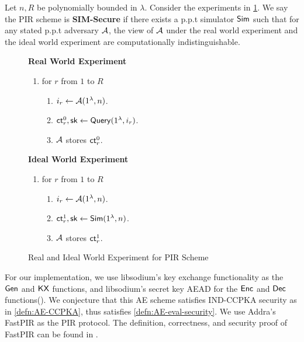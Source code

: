 \begin{definition}
\label{defn:PIR-SIM-security}
Let $n, R$ be polynomially bounded in $\lambda$. Consider the experiments in \cref{expr:pir-real-ideal-world}. We say the PIR scheme is \textbf{SIM-Secure} if there exists a p.p.t simulator $\mathsf{Sim}$ such that for any stated p.p.t adversary $\mathcal{A}$, the view of $\mathcal{A}$ under the real world experiment and the ideal world experiment are computationally indistinguishable. 

\begin{figure}[h!]
\begin{framed}
\textbf{Real World Experiment}
\begin{enumerate}
    \item for $r$ from $1$ to $R$
    \begin{enumerate}
        \item $i_r \leftarrow \mathcal{A}(1^{\lambda}, n)$.
        \item $\mathsf{ct}_r^0, {\mathsf{sk}} \leftarrow \mathsf{Query}(1^{\lambda}, i_r)$.
        \item $\mathcal{A}$ stores $\mathsf{ct}_r^0$.
    \end{enumerate}
\end{enumerate}
\textbf{Ideal World Experiment}
\begin{enumerate}
    \item for $r$ from $1$ to $R$
    \begin{enumerate}
        \item $i_r \leftarrow \mathcal{A}(1^{\lambda}, n)$.
        \item $\mathsf{ct}_r^1, {\mathsf{sk}} \leftarrow \mathsf{Sim}(1^{\lambda}, n)$.
        \item $\mathcal{A}$ stores $\mathsf{ct}_r^1$.
    \end{enumerate}
\end{enumerate}
\end{framed}
\caption{Real and Ideal World Experiment for PIR Scheme}
\label{expr:pir-real-ideal-world}
\end{figure}
\end{definition}
For our implementation, we use libsodium's key exchange functionality as the $\mathsf{Gen}$ and $\mathsf{KX}$ functions, and libsodium's secret key AEAD for the $\mathsf{Enc}$ and $\mathsf{Dec}$ functions(\cite{libsodium}). We conjecture that this AE scheme satisfies IND-CCPKA security as in \cref{defn:AE-CCPKA}, thus satisfies \cref{defn:AE-eval-security}. We use Addra's FastPIR as the PIR protocol. The definition, correctness, and security proof of FastPIR can be found in \cite[Section 4]{ahmad2021addra}.

